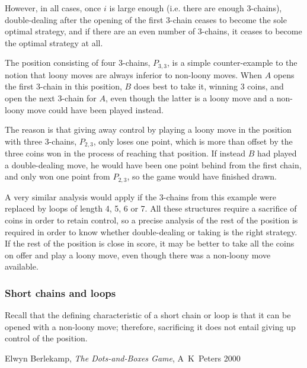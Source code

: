 \documentclass[a4paper,twocolumn]{article}
\begin{document}
However, in all cases, once $i$ is large enough (i.e. there are enough
3-chains), double-dealing after the opening of the first 3-chain
ceases to become the sole optimal strategy, and if there are an even
number of 3-chains, it ceases to become the optimal strategy at all.

The position consisting of four 3-chains, $P_{3,3}$, is a simple
counter-example to the notion that loony moves are always inferior to
non-loony moves. When $A$ opens the first 3-chain in this position,
$B$ does best to take it, winning 3 coins, and open the next 3-chain
for $A$, even though the latter is a loony move and a non-loony move
could have been played instead.

The reason is that giving away control by playing a loony move in the
position with three 3-chains, $P_{2,3}$, only loses one point, which
is more than offset by the three coins won in the process of reaching
that position. If instead $B$ had played a double-dealing move, he
would have been one point behind from the first chain, and only won
one point from $P_{2,3}$, so the game would have finished drawn.

A very similar analysis would apply if the 3-chains from this example
were replaced by loops of length 4, 5, 6 or 7. All these structures
require a sacrifice of coins in order to retain control, so a precise
analysis of the rest of the position is required in order to know
whether double-dealing or taking is the right strategy. If the rest of
the position is close in score, it may be better to take all the coins
on offer and play a loony move, even though there was a non-loony move
available.

\subsubsection{Short chains and loops}

Recall that the defining characteristic of a short chain or loop is
that it can be opened with a non-loony move; therefore, sacrificing it
does not entail giving up control of the position.

\begin{thebibliography}{99}
   Elwyn Berlekamp, \emph{The Dots-and-Boxes Game},
    A~K~Peters 2000
\end{thebibliography}
\end{document}

